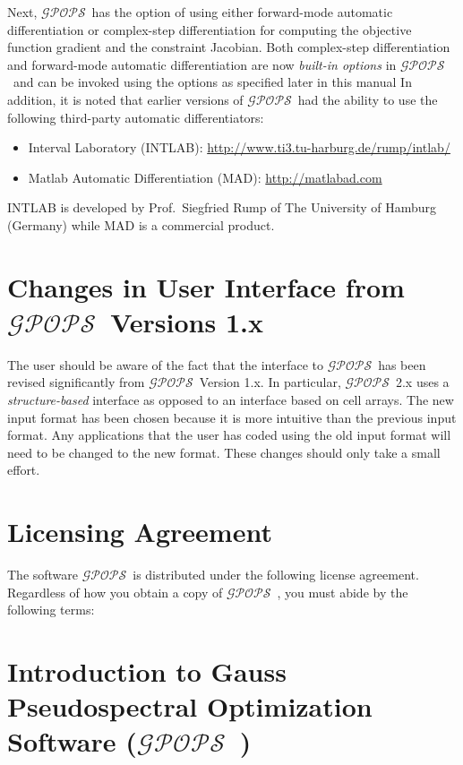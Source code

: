 \documentclass[10pt,final]{report}
\newcommand{\gpops}{$\mathcal{GPOPS}$~}
\begin{document}
Next, \gpops has the option of using either forward-mode automatic
differentiation or  complex-step differentiation for computing the
objective function gradient and the constraint Jacobian.  Both
complex-step differentiation and forward-mode automatic
differentiation are now {\em built-in options} in \gpops and can be
invoked using the options as specified later in this manual  In
addition, it is noted that earlier versions of \gpops had the ability to
use the following third-party automatic differentiators:
\begin{itemize}
\item Interval Laboratory (INTLAB):  \url{http://www.ti3.tu-harburg.de/rump/intlab/}
\item Matlab Automatic Differentiation (MAD):  \url{http://matlabad.com}
\end{itemize}
INTLAB is developed by Prof.~Siegfried Rump of The University of
Hamburg (Germany) while MAD is a commercial product.

\chapter*{Changes in User Interface from \gpops Versions 1.x}

The user should be aware of the fact that the interface to \gpops has
been revised significantly from \gpops Version 1.x.  In particular,
\gpops 2.x uses a {\em structure-based} interface as opposed to an
interface based on cell arrays.  The new input format has been chosen
because it is more intuitive than the previous input format.  Any
applications that the user has coded using the old input format will
need to be changed to the new format.  These changes should only take
a small effort.

\chapter*{Licensing Agreement}

The software \gpops is distributed under the following license
agreement.  Regardless of how you obtain a copy of \gpops, you must
abide by the following terms:


\tableofcontents

\newpage

\chapter{Introduction to Gauss Pseudospectral Optimization Software  (\gpops)}
\end{document}

